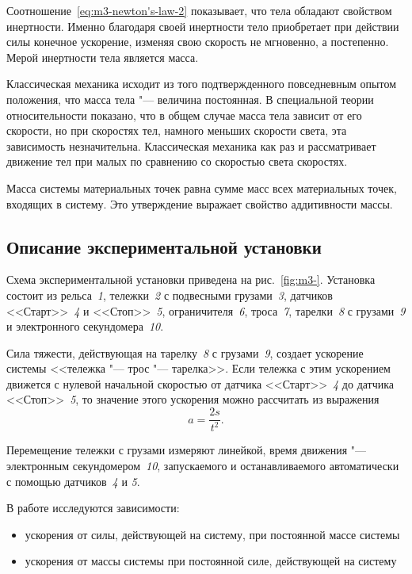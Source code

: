 \documentclass[a4paper, 12pt]{extarticle}
\begin{document}
Соотношение~\eqref{eq:m3-newton's-law-2} показывает, что тела обладают свойством инертности. Именно благодаря своей инертности тело приобретает при действии силы конечное ускорение, изменяя свою скорость не мгновенно, а постепенно. Мерой инертности тела является масса.

Классическая механика исходит из того подтвержденного повседневным опытом положения, что масса тела "--- величина постоянная. В специальной теории относительности показано, что в общем случае масса тела зависит от его скорости, но при скоростях тел, намного меньших скорости света, эта зависимость незначительна. Классическая механика как раз и рассматривает движение тел при малых по сравнению со скоростью света скоростях.

Масса системы материальных точек равна сумме масс всех материальных точек, входящих в систему. Это утверждение выражает свойство аддитивности массы.

\subsection{Описание экспериментальной установки}
Схема экспериментальной установки приведена на рис.~\ref{fig:m3-}. Установка состоит из рельса~\emph{1}, тележки~\emph{2} с подвесными грузами~\emph{3}, датчиков <<Старт>>~\emph{4} и <<Стоп>>~\emph{5}, ограничителя~\emph{6}, троса~\emph{7}, тарелки~\emph{8} с грузами~\emph{9} и электронного секундомера~\emph{10}.

Сила тяжести, действующая на тарелку~\emph{8} с грузами~\emph{9}, создает ускорение системы <<тележка "--- трос "--- тарелка>>. Если тележка с этим ускорением движется с нулевой начальной скоростью от датчика <<Старт>>~\emph{4} до датчика <<Стоп>>~\emph{5}, то значение этого ускорения можно рассчитать из выражения %
\begin{equation}
\label{eq:m3-acceleration}
a = \frac{2s}{t^2}.
\end{equation}

Перемещение тележки с грузами измеряют линейкой, время движения "--- электронным секундомером~\emph{10}, запускаемого и останавливаемого автоматически с помощью датчиков~\emph{4} и \emph{5}. %

В работе исследуются зависимости:
\begin{itemize}
\item ускорения от силы, действующей на систему, при постоянной массе системы
\item ускорения от массы системы при постоянной силе, действующей на систему %
\end{itemize}
\end{document}
